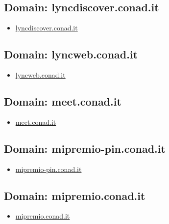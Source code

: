 \documentclass{article}
\begin{document}
    \subsection{Domain: lyncdiscover.conad.it}
    \begin{itemize}
        
            
            \item \href{ https://lyncdiscover.conad.it/}{ lyncdiscover.conad.it }
            
        
    \end{itemize}

    \subsection{Domain: lyncweb.conad.it}
    \begin{itemize}
        
            
            \item \href{ https://lyncweb.conad.it/}{ lyncweb.conad.it }
            
        
    \end{itemize}

    \subsection{Domain: meet.conad.it}
    \begin{itemize}
        
            
            \item \href{ https://meet.conad.it/}{ meet.conad.it }
            
        
    \end{itemize}

    \subsection{Domain: mipremio-pin.conad.it}
    \begin{itemize}
        
            
            \item \href{ http://mipremio-pin.conad.it/}{ mipremio-pin.conad.it }
            
        
    \end{itemize}

    \subsection{Domain: mipremio.conad.it}
    \begin{itemize}
        
            
            \item \href{ https://mipremio.conad.it/}{ mipremio.conad.it }
            
        
    \end{itemize}
\end{document}
